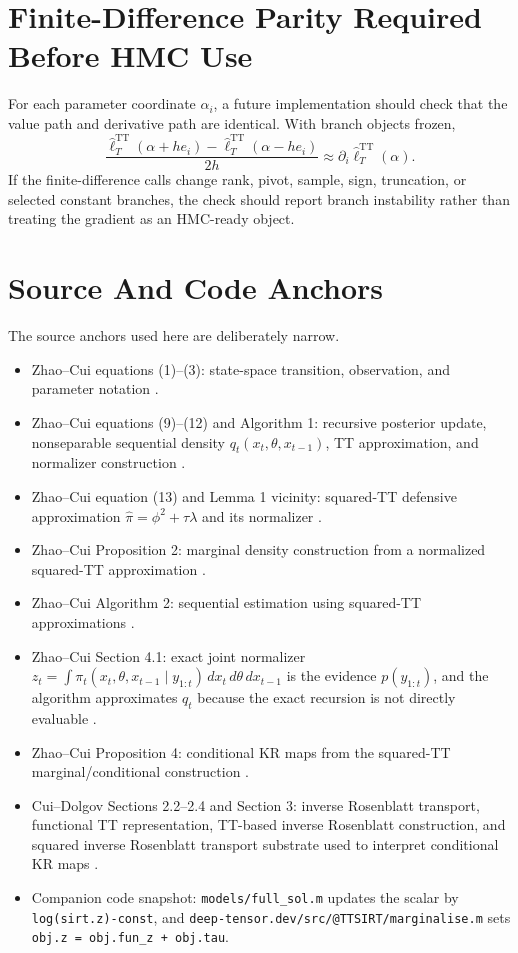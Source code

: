 \documentclass[11pt]{article}
\newcommand{\TT}{\mathrm{TT}}
\theoremstyle{definition}
\theoremstyle{remark}
\begin{document}
\section{Finite-Difference Parity Required Before HMC Use}

For each parameter coordinate \(\alpha_i\), a future implementation should
check that the value path and derivative path are identical.  With branch
objects frozen,
\[
  \frac{\widehat\ell_T^{\TT}(\alpha+h e_i)
        -\widehat\ell_T^{\TT}(\alpha-h e_i)}{2h}
  \approx
  \partial_i\widehat\ell_T^{\TT}(\alpha).
\]
If the finite-difference calls change rank, pivot, sample, sign, truncation, or
selected constant branches, the check should report branch instability rather
than treating the gradient as an HMC-ready object.

\section{Source And Code Anchors}

The source anchors used here are deliberately narrow.

\begin{itemize}[leftmargin=*]
\item Zhao--Cui equations (1)--(3): state-space transition, observation, and
  parameter notation \cite{zhao-cui-2024}.
\item Zhao--Cui equations (9)--(12) and Algorithm 1: recursive posterior
  update, nonseparable sequential density
  \(q_t(x_t,\theta,x_{t-1})\), TT approximation, and normalizer construction
  \cite{zhao-cui-2024}.
\item Zhao--Cui equation (13) and Lemma 1 vicinity: squared-TT defensive
  approximation \(\widehat\pi=\phi^2+\tau\lambda\) and its normalizer
  \cite{zhao-cui-2024}.
\item Zhao--Cui Proposition 2: marginal density construction from a normalized
  squared-TT approximation \cite{zhao-cui-2024}.
\item Zhao--Cui Algorithm 2: sequential estimation using squared-TT
  approximations \cite{zhao-cui-2024}.
\item Zhao--Cui Section 4.1: exact joint normalizer
  \(z_t=\int\pi_t(x_t,\theta,x_{t-1}\mid y_{1:t})\,dx_t\,d\theta\,dx_{t-1}\)
  is the evidence \(p(y_{1:t})\), and the algorithm approximates \(q_t\)
  because the exact recursion is not directly evaluable \cite{zhao-cui-2024}.
\item Zhao--Cui Proposition 4: conditional KR maps from the squared-TT
  marginal/conditional construction \cite{zhao-cui-2024}.
\item Cui--Dolgov Sections 2.2--2.4 and Section 3: inverse Rosenblatt
  transport, functional TT representation, TT-based inverse Rosenblatt
  construction, and squared inverse Rosenblatt transport substrate used to
  interpret conditional KR maps \cite{cui-dolgov-2022}.
\item Companion code snapshot:
  \texttt{models/full\_sol.m} updates the scalar by
  \texttt{log(sirt.z)-const}, and
  \texttt{deep-tensor.dev/src/@TTSIRT/marginalise.m} sets
  \texttt{obj.z = obj.fun\_z + obj.tau}.
\end{itemize}
\end{document}
